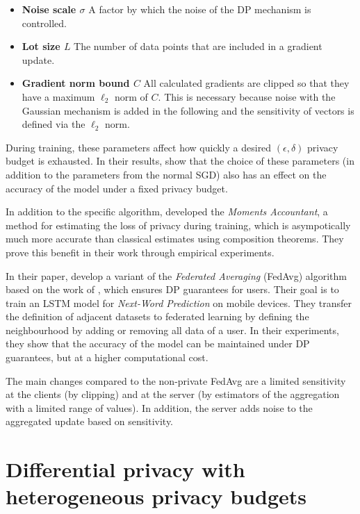 \begin{itemize}
  \item \textbf{Noise scale $\sigma$} A factor by which the noise of the DP mechanism is controlled. 
  \item \textbf{Lot size $L$} The number of data points that are included in a gradient update.
  \item \textbf{Gradient norm bound $C$} All calculated gradients are clipped so that they have a maximum $\ell_2$ norm of $C$. This is necessary because noise with the Gaussian mechanism is added in the following and the sensitivity of vectors is defined via the $\ell_2$ norm. 
\end{itemize}

During training, these parameters affect how quickly a desired $(\epsilon, \delta)$ privacy budget is exhausted. In their results, \textcite{abadi:2016} show that the choice of these parameters (in addition to the parameters from the normal SGD) also has an effect on the accuracy of the model under a fixed privacy budget.

In addition to the specific algorithm, \textcite{abadi:2016} developed the \textit{Moments Accountant}, a method for estimating the loss of privacy during training, which is asympotically much more accurate than classical estimates using composition theorems. They prove this benefit in their work through empirical experiments.

In their paper, \textcite{mcmahan:2018} develop a variant of the \textit{Federated Averaging} (FedAvg) algorithm \parencite{mcmahan:2016} based on the work of \textcite{abadi:2016}, which ensures DP guarantees for users. Their goal is to train an LSTM model for \textit{Next-Word Prediction} on mobile devices. They transfer the definition of adjacent datasets to federated learning by defining the neighbourhood by adding or removing all data of a user. In their experiments, they show that the accuracy of the model can be maintained under DP guarantees, but at a higher computational cost.

The main changes compared to the non-private FedAvg are a limited sensitivity at the clients (by clipping) and at the server (by estimators of the aggregation with a limited range of values). In addition, the server adds noise to the aggregated update based on sensitivity.

\section{Differential privacy with heterogeneous privacy budgets}

